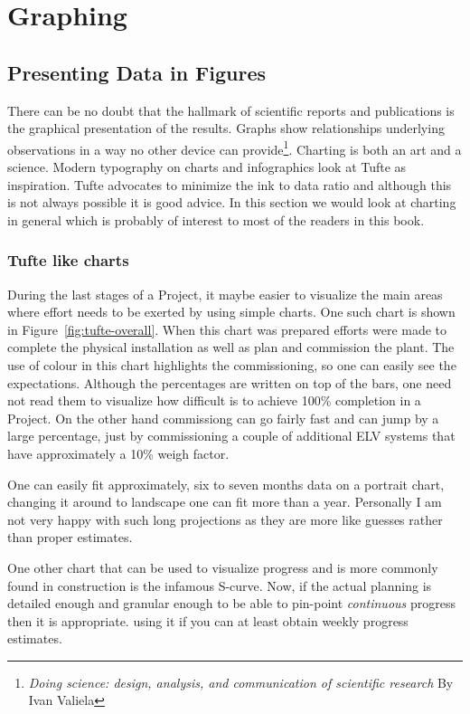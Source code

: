 \documentclass[a4paper]{book}
\begin{document}
\part{Graphing}
\chapter{Presenting Data in Figures}

There can be no doubt that the hallmark of scientific reports and publications is the graphical presentation of the results. Graphs show relationships underlying observations in a way no other device can provide\footnote{\textit{Doing science: design, analysis, and communication of scientific research}
 By Ivan Valiela}. 
Charting is both an art and a science. Modern typography on charts and infographics look at Tufte as inspiration.
Tufte advocates to minimize the ink to data ratio and although this is not always possible it is good advice.
In this section we would look at charting in general which is probably of interest to most of the readers
in this book. 

\section{Tufte like charts}

During the last stages of a Project, it maybe easier to visualize the
main areas where effort needs to be exerted by using simple charts. One
such chart is shown in Figure~\ref{fig:tufte-overall}. When this chart
was prepared efforts were made to complete the physical installation
as well as plan and commission the plant. The use of colour in this
chart highlights the commissioning, so one can easily see the expectations. Although the percentages are written on top of the bars,
one need not read them to visualize how difficult is to achieve
100\% completion in a Project. On the other hand commissiong can go
fairly fast and can jump by a large percentage, just by
commissioning a couple of additional ELV systems that have approximately
a 10\% weigh factor.

One can easily fit approximately, six to seven months data on
a portrait chart, changing it around to landscape one can fit
more than a year. Personally I am not very happy with such long
projections as they are more like guesses rather than proper estimates.

One other chart that can be used to visualize progress and is more
commonly found in construction is the infamous S-curve. Now, if
the actual planning is detailed enough and granular enough to be
able to pin-point \textit{continuous} progress then it is
appropriate. using it if you can at least obtain weekly progress
estimates.
\end{document}

